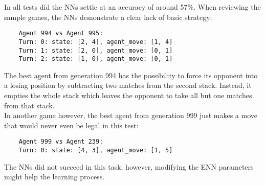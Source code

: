In all tests did the NNs settle at an accuracy of around 57\%.
When reviewing the sample games, the NNs demonstrate a clear lack of basic strategy:
\begin{verbatim}
    Agent 994 vs Agent 995:
    Turn: 0: state: [2, 4], agent_move: [1, 4]
    Turn: 1: state: [2, 0], agent_move: [0, 1]
    Turn: 2: state: [1, 0], agent_move: [0, 1]
\end{verbatim}
The best agent from generation 994 has the possibility to force its opponent into a losing position by subtracting two matches from the second stack.
Instead, it empties the whole stack which leaves the opponent to take all but one matches from that stack.
\\
In another game however, the best agent from generation 999 just makes a move that would never even be legal in this test:
\begin{verbatim}
    Agent 999 vs Agent 239:
    Turn: 0: state: [4, 3], agent_move: [1, 5]
\end{verbatim}
The NNs did not succeed in this task, however, modifying the ENN parameters might help the learning process.

